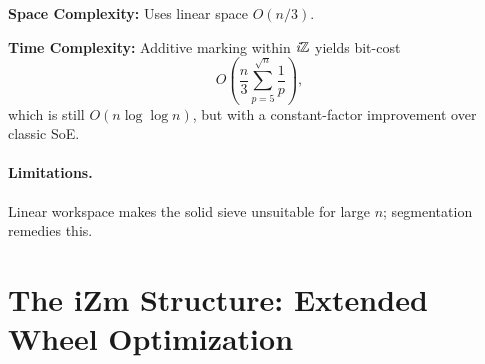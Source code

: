\documentclass{article}
\begin{document}
\noindent
\textbf{Space Complexity:} Uses linear space $O(n/3)$.

\noindent
\textbf{Time Complexity:} Additive marking within $\textit{i}\mathbb{Z}$ yields bit-cost
$$O\left( \frac{n}{3} \sum_{p = 5}^{\sqrt{n}} \frac{1}{p} \right),$$
which is still $O(n \log \log n)$, but with a constant-factor improvement over classic SoE.

\paragraph{Limitations.} Linear workspace makes the solid sieve unsuitable for large $n$; segmentation remedies this.


\section{The iZm Structure: Extended Wheel Optimization} \label{sec:izm_structure}

\newpage
\end{document}
